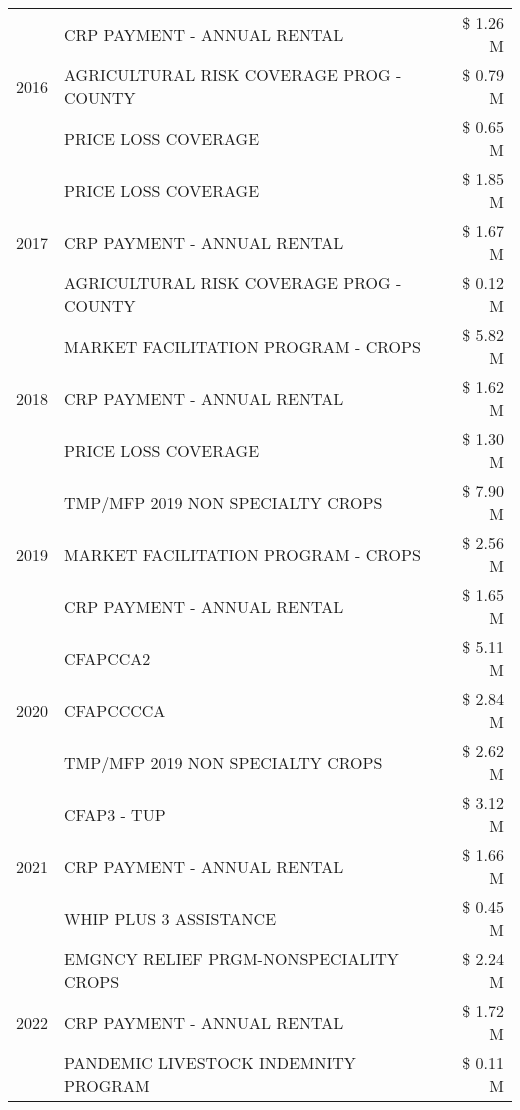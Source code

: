 \begin{tabular}{llr}
\cline{1-3}
\multirow[t]{3}{*}{2016} & CRP PAYMENT - ANNUAL RENTAL & \$ 1.26 M \\
 & AGRICULTURAL RISK COVERAGE PROG - COUNTY & \$ 0.79 M \\
 & PRICE LOSS COVERAGE & \$ 0.65 M \\
\cline{1-3}
\multirow[t]{3}{*}{2017} & PRICE LOSS COVERAGE & \$ 1.85 M \\
 & CRP PAYMENT - ANNUAL RENTAL & \$ 1.67 M \\
 & AGRICULTURAL RISK COVERAGE PROG - COUNTY & \$ 0.12 M \\
\cline{1-3}
\multirow[t]{3}{*}{2018} & MARKET FACILITATION PROGRAM - CROPS & \$ 5.82 M \\
 & CRP PAYMENT - ANNUAL RENTAL & \$ 1.62 M \\
 & PRICE LOSS COVERAGE & \$ 1.30 M \\
\cline{1-3}
\multirow[t]{3}{*}{2019} & TMP/MFP 2019 NON SPECIALTY CROPS & \$ 7.90 M \\
 & MARKET FACILITATION PROGRAM - CROPS & \$ 2.56 M \\
 & CRP PAYMENT - ANNUAL RENTAL & \$ 1.65 M \\
\cline{1-3}
\multirow[t]{3}{*}{2020} & CFAPCCA2 & \$ 5.11 M \\
 & CFAPCCCCA & \$ 2.84 M \\
 & TMP/MFP 2019 NON SPECIALTY CROPS & \$ 2.62 M \\
\cline{1-3}
\multirow[t]{3}{*}{2021} & CFAP3 - TUP & \$ 3.12 M \\
 & CRP PAYMENT - ANNUAL RENTAL & \$ 1.66 M \\
 & WHIP PLUS 3 ASSISTANCE & \$ 0.45 M \\
\cline{1-3}
\multirow[t]{3}{*}{2022} & EMGNCY RELIEF PRGM-NONSPECIALITY CROPS & \$ 2.24 M \\
 & CRP PAYMENT - ANNUAL RENTAL & \$ 1.72 M \\
 & PANDEMIC LIVESTOCK INDEMNITY PROGRAM & \$ 0.11 M \\
\cline{1-3}
\bottomrule
\end{tabular}
